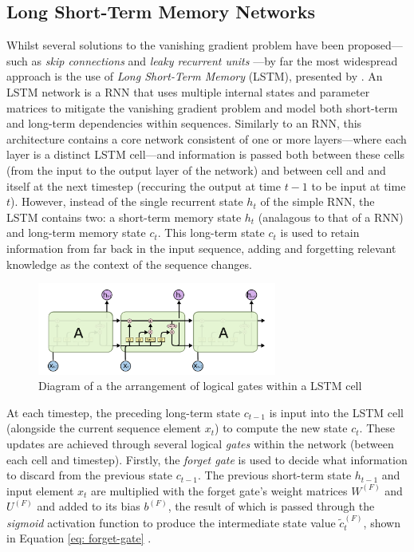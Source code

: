 \documentclass[a4paper, 11pt]{report}
\begin{document}
    \subsection{Long Short-Term Memory Networks}

    Whilst several solutions to the vanishing gradient problem have been proposed---such as \emph{skip connections} and \emph{leaky recurrent units} \citep{pascanu-2012}---by far the most widespread approach is the use of \emph{Long Short-Term Memory} (LSTM), presented by \citet{hochreiter-1997}. An LSTM network is a RNN that uses multiple internal states and parameter matrices to mitigate the vanishing gradient problem and model both short-term and long-term dependencies within sequences. Similarly to an RNN, this architecture contains a core network consistent of one or more layers---where each layer is a distinct LSTM cell---and information is passed both between these cells (from the input to the output layer of the network) and between cell and and itself at the next timestep (reccuring the output at time $t-1$ to be input at time $t$). However, instead of the single recurrent state $h_t$ of the simple RNN, the LSTM contains two: a short-term memory state $h_t$ (analagous to that of a RNN) and long-term memory state $c_t$. This long-term state $c_t$ is used to retain information from far back in the input sequence, adding and forgetting relevant knowledge as the context of the sequence changes. 

    \begin{figure}[ht]
        \label{fig: lstm}
        \centering
        \includegraphics[width=0.7\textwidth]{lstm.png}
        \caption{\centering Diagram of a the arrangement of logical gates within a LSTM cell}
    \end{figure}

    At each timestep, the preceding long-term state $c_{t-1}$ is input into the LSTM cell (alongside the current sequence element $x_t$) to compute the new state $c_t$. These updates are achieved through several logical \emph{gates} within the network (between each cell and timestep). Firstly, the \emph{forget gate} is used to decide what information to discard from the previous state $c_{t-1}$. The previous short-term state $h_{t-1}$ and input element $x_t$ are multiplied with the forget gate's weight matrices $W^{(F)}$ and $U^{(F)}$ and added to its bias $b^{(F)}$, the result of which is passed through the \emph{sigmoid} activation function to produce the intermediate state value $\tilde{c}^{(F)}_t$, shown in Equation \ref{eq: forget-gate} \citep{zhang-2021}.
\end{document}

